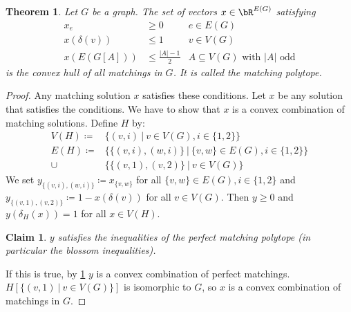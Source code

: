\documentclass[11pt, a4paper]{article}
\newcommand{\abs}[1]{\left\lvert#1\right\rvert}
\newcommand{\set}[1]{\{#1\}}
\newtheorem{theorem}{Theorem}[section]
\newtheorem*{claim}{Claim}
\theoremstyle{remark}
\theoremstyle{definition}
\begin{document}
\begin{theorem}\label{thm:perf-match-poly}
	Let $G$ be a graph. The set of vectors $x\in\bR^{E(G)}$ satisfying
	\begin{align*}
		x_e          & \geq0                                     & e\in E(G) \\
		x(\delta(v)) & \leq1                                     & v\in V(G) \\
		x(E(G[A]))   & \leq\frac{\abs{A}-1}{2}
		             & A\subseteq V(G)\text{ with $\abs{A}$ odd}
	\end{align*}
	is the convex hull of all matchings in $G$. It is called the \emph{matching
		polytope}.
\end{theorem}
\begin{proof}
	Any matching solution $x$ satisfies these conditions. Let $x$ be any
	solution that satisfies the conditions. We have to show that $x$ is a
	convex combination of matching solutions. Define $H$ by:
	\begin{align*}
		V(H)\coloneqq & \set{(v,i)\ |\ v\in V(G),i\in\set{1,2}}                     \\
		E(H)\coloneqq & \set{\set{(v,i),(w,i)}\ |\ \set{v,w}\in E(G),i\in\set{1,2}} \\
		\cup          & \set{\set{(v,1),(v,2)}\ |\ v\in V(G)}
	\end{align*}
	We set $y_{\set{(v,i),(w,i)}}\coloneqq x_{\set{v,w}}$ for all $\set{v,w}
		\in E(G),i\in\set{1,2}$ and $y_{\set{(v,1),(v,2)}}\coloneqq 1-x(\delta(v))$
	for all $v\in V(G)$. Then $y\geq0$ and $y(\delta_H(x))=1$ for all
	$x\in V(H)$.
	\begin{claim}
		$y$ satisfies the inequalities of the perfect matching polytope
		(in particular the blossom inequalities).
	\end{claim}
	If this is true, by \ref{thm:perf-match-poly} $y$ is a convex combination
	of perfect matchings. $H[\set{(v,1)\ |\ v\in V(G)}]$ is isomorphic to $G$,
	so $x$ is a convex combination of matchings in $G$.


\end{proof}
\end{document}
